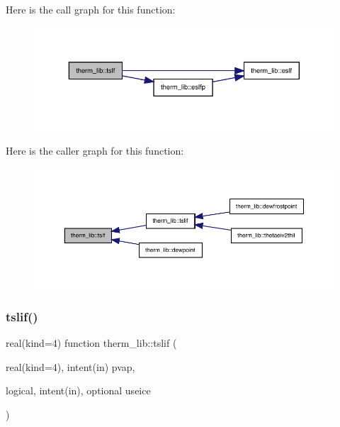 Here is the call graph for this function\+:
\nopagebreak
\begin{figure}[H]
\begin{center}
\leavevmode
\includegraphics[width=343pt]{namespacetherm__lib_af4ba481a98f65fb3f1e2ff6fb30ace23_cgraph}
\end{center}
\end{figure}
Here is the caller graph for this function\+:
\nopagebreak
\begin{figure}[H]
\begin{center}
\leavevmode
\includegraphics[width=350pt]{namespacetherm__lib_af4ba481a98f65fb3f1e2ff6fb30ace23_icgraph}
\end{center}
\end{figure}
\mbox{\label{namespacetherm__lib_a7448671da269afe05b39189c581f790b}} 
\subsubsection{\texorpdfstring{tslif()}{tslif()}}
{\footnotesize\ttfamily real(kind=4) function therm\+\_\+lib\+::tslif (\begin{DoxyParamCaption}\item[{real(kind=4), intent(in)}]{pvap,  }\item[{logical, intent(in), optional}]{useice }\end{DoxyParamCaption})}

